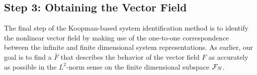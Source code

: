 \subsection{Step 3: Obtaining the Vector Field} \label{sec:step3}

The final step of the Koopman-based system identification method is to identify the nonlinear vector field by making use of the one-to-one correspondence between the infinite and finite dimensional system representations.
As earlier, our goal is to find a $\bar{F}$ that describes the behavior of the vector field $F$ as accurately as possible in the $L^2$-norm sense on the finite dimensional subspace $\mathcal{F}_N$.






